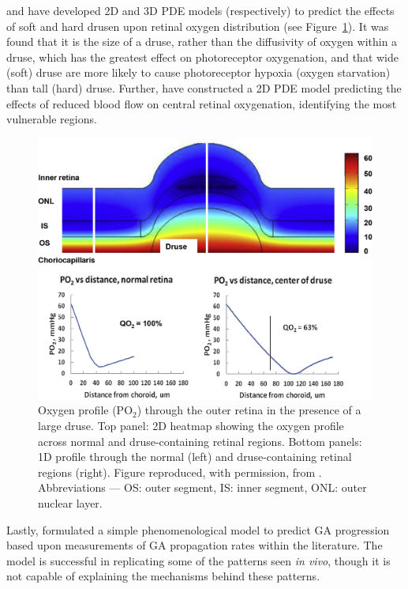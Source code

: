 \documentclass{article}
\begin{document}
\citet{Linsenmeier_and_Zhang_2017} and \citet{McHugh_et_al_2019} have developed 2D and 3D PDE models (respectively) to predict the effects of soft and hard drusen upon retinal oxygen distribution (see Figure~\ref{Fig_LinZhang2017}). It was found that it is the size of a druse, rather than the diffusivity of oxygen within a druse, which has the greatest effect on photoreceptor oxygenation, and that wide (soft) druse are more likely to cause photoreceptor hypoxia (oxygen starvation) than tall (hard) druse. Further, \citet{Vercellin_et_al_2021} have constructed a 2D PDE model predicting the effects of reduced blood flow on central retinal oxygenation, identifying the most vulnerable regions.
%
\begin{figure}
\begin{center}
\includegraphics[scale=0.9]{Linsenmeier__and_Zhang_2017_Fig_21}
\end{center}
\caption{Oxygen profile (PO$_2$) through the outer retina in the presence of a large druse. Top panel: 2D heatmap showing the oxygen profile across normal and druse-containing retinal regions. Bottom panels: 1D profile through the normal (left) and druse-containing retinal regions (right). Figure reproduced, with permission, from \citet{Linsenmeier_and_Zhang_2017}. Abbreviations --- OS: outer segment, IS: inner segment, ONL: outer nuclear layer.}
\label{Fig_LinZhang2017}
\end{figure}
%

Lastly, \citet{Shen_et_al_2020} formulated a simple phenomenological model to predict GA progression based upon measurements of GA propagation rates within the literature. The model is successful in replicating some of the patterns seen \emph{in vivo}, though it is not capable of explaining the mechanisms behind these patterns.
%
%
\end{document}
